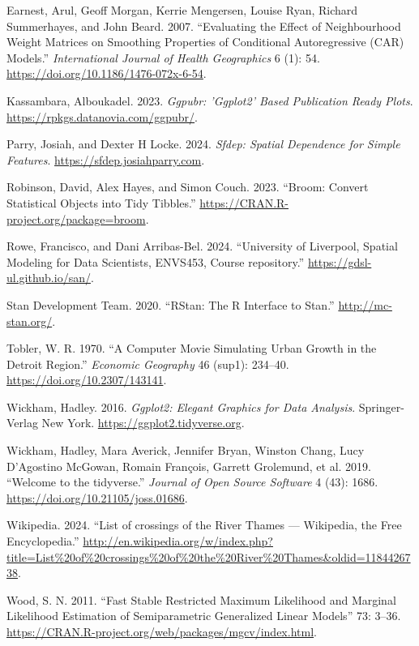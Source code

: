 \begin{CSLReferences}{1}{0}
\leavevmode{}%
Earnest, Arul, Geoff Morgan, Kerrie Mengersen, Louise Ryan, Richard Summerhayes, and John Beard. 2007. {``Evaluating the Effect of Neighbourhood Weight Matrices on Smoothing Properties of Conditional Autoregressive (CAR) Models.''} \emph{International Journal of Health Geographics} 6 (1): 54. \url{https://doi.org/10.1186/1476-072x-6-54}.

\leavevmode{}%
Kassambara, Alboukadel. 2023. \emph{Ggpubr: 'Ggplot2' Based Publication Ready Plots}. \url{https://rpkgs.datanovia.com/ggpubr/}.

\leavevmode{}%
Parry, Josiah, and Dexter H Locke. 2024. \emph{Sfdep: Spatial Dependence for Simple Features}. \url{https://sfdep.josiahparry.com}.

\leavevmode{}%
Robinson, David, Alex Hayes, and Simon Couch. 2023. {``Broom: Convert Statistical Objects into Tidy Tibbles.''} \url{https://CRAN.R-project.org/package=broom}.

\leavevmode{}%
Rowe, Francisco, and Dani Arribas-Bel. 2024. {``{University of Liverpool, Spatial Modeling for Data Scientists, ENVS453, Course repository}.''} \url{https://gdsl-ul.github.io/san/}.

\leavevmode{}%
Stan Development Team. 2020. {``{RStan}: The {R} Interface to {Stan}.''} \url{http://mc-stan.org/}.

\leavevmode{}%
Tobler, W. R. 1970. {``A Computer Movie Simulating Urban Growth in the Detroit Region.''} \emph{Economic Geography} 46 (sup1): 234--40. \url{https://doi.org/10.2307/143141}.

\leavevmode{}%
Wickham, Hadley. 2016. \emph{Ggplot2: Elegant Graphics for Data Analysis}. Springer-Verlag New York. \url{https://ggplot2.tidyverse.org}.

\leavevmode{}%
Wickham, Hadley, Mara Averick, Jennifer Bryan, Winston Chang, Lucy D'Agostino McGowan, Romain François, Garrett Grolemund, et al. 2019. {``Welcome to the {tidyverse}.''} \emph{Journal of Open Source Software} 4 (43): 1686. \url{https://doi.org/10.21105/joss.01686}.

\leavevmode{}%
Wikipedia. 2024. {``{List of crossings of the River Thames} --- {W}ikipedia{,} the Free Encyclopedia.''} \url{http://en.wikipedia.org/w/index.php?title=List\%20of\%20crossings\%20of\%20the\%20River\%20Thames\&oldid=1184426738}.

\leavevmode{}%
Wood, S. N. 2011. {``Fast Stable Restricted Maximum Likelihood and Marginal Likelihood Estimation of Semiparametric Generalized Linear Models''} 73: 3--36. \url{https://CRAN.R-project.org/web/packages/mgcv/index.html}.

\end{CSLReferences}

